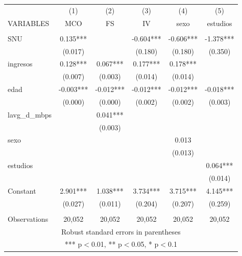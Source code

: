\begin{tabular}{lccccc} \hline
 & (1) & (2) & (3) & (4) & (5) \\
VARIABLES & MCO & FS & IV & sexo & estudios \\ \hline
 &  &  &  &  &  \\
SNU & 0.135*** &  & -0.604*** & -0.606*** & -1.378*** \\
 & (0.017) &  & (0.180) & (0.180) & (0.350) \\
ingresos & 0.128*** & 0.067*** & 0.177*** & 0.178*** &  \\
 & (0.007) & (0.003) & (0.014) & (0.014) &  \\
edad & -0.003*** & -0.012*** & -0.012*** & -0.012*** & -0.018*** \\
 & (0.000) & (0.000) & (0.002) & (0.002) & (0.003) \\
lavg\_d\_mbps &  & 0.041*** &  &  &  \\
 &  & (0.003) &  &  &  \\
sexo &  &  &  & 0.013 &  \\
 &  &  &  & (0.013) &  \\
estudios &  &  &  &  & 0.064*** \\
 &  &  &  &  & (0.014) \\
Constant & 2.901*** & 1.038*** & 3.734*** & 3.715*** & 4.145*** \\
 & (0.027) & (0.011) & (0.204) & (0.207) & (0.259) \\
 &  &  &  &  &  \\
 Observations & 20,052 & 20,052 & 20,052 & 20,052 & 20,052 \\ \hline
\multicolumn{6}{c}{ Robust standard errors in parentheses} \\
\multicolumn{6}{c}{ *** p$<$0.01, ** p$<$0.05, * p$<$0.1} \\
\end{tabular}
